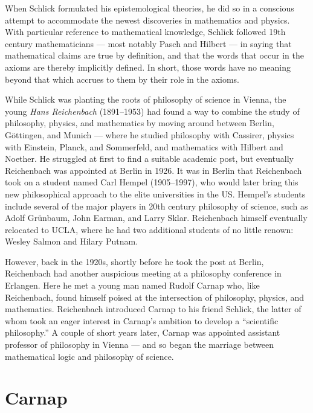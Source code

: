 When Schlick formulated his epistemological theories, he did so in a
conscious attempt to accommodate the newest discoveries in mathematics
and physics.  With particular reference to mathematical knowledge,
Schlick followed 19th century mathematicians --- most notably Pasch
and Hilbert --- in saying that mathematical claims are true by
definition, and that the words that occur in the axioms are thereby
implicitly defined.  In short, those words have no meaning beyond that
which accrues to them by their role in the axioms.

While Schlick was planting the roots of philosophy of science in
Vienna, the young \emph{Hans Reichenbach} (1891--1953) had found a way
to combine the study of philosophy, physics, and mathematics by moving
around between Berlin, G\"ottingen, and Munich --- where he studied
philosophy with Cassirer, physics with Einstein, Planck, and
Sommerfeld, and mathematics with Hilbert and Noether.  He struggled at
first to find a suitable academic post, but eventually Reichenbach was
appointed at Berlin in 1926.  It was in Berlin that Reichenbach took
on a student named Carl Hempel (1905--1997), who would later bring
this new philosophical approach to the elite universities in the US.
Hempel's students include several of the major players in 20th century
philosophy of science, such as Adolf Gr\"unbaum, John Earman, and
Larry Sklar.  Reichenbach himself eventually relocated to UCLA, where
he had two additional students of no little renown: Wesley Salmon and
Hilary Putnam.

However, back in the 1920s, shortly before he took the post at Berlin,
Reichenbach had another auspicious meeting at a philosophy conference
in Erlangen.  Here he met a young man named Rudolf Carnap who, like
Reichenbach, found himself poised at the intersection of philosophy,
physics, and mathematics.  Reichenbach introduced Carnap to his friend
Schlick, the latter of whom took an eager interest in Carnap's
ambition to develop a ``scientific philosophy.''  A couple of short
years later, Carnap was appointed assistant professor of philosophy in
Vienna --- and so began the marriage between mathematical logic and
philosophy of science.

\section*{Carnap}


